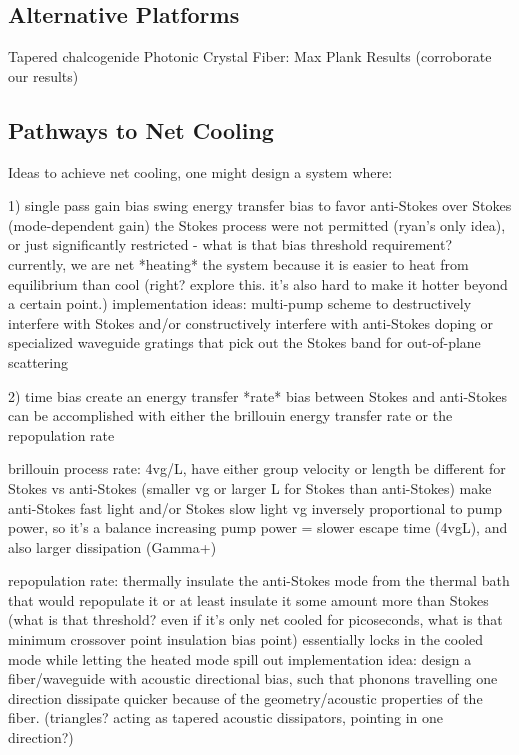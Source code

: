 
\subsection{Alternative Platforms}
\label{Cooling:subsec:AlternativePlatforms}

Tapered chalcogenide Photonic Crystal Fiber: Max Plank Results (corroborate our results)

\subsection{Pathways to Net Cooling}
\label{Cooling:subsec:PathwaystoNetCooling}

Ideas to achieve net cooling, one might design a system where:

1) single pass gain bias
     swing energy transfer bias to favor anti-Stokes over Stokes (mode-dependent gain)
     the Stokes process were not permitted (ryan's only idea), or just significantly restricted - what is that bias threshold requirement?
     currently, we are net *heating* the system because it is easier to heat from equilibrium than cool (right? explore this. it's also hard to make it hotter beyond a certain point.)
     implementation ideas:
       multi-pump scheme to destructively interfere with Stokes and/or constructively interfere with anti-Stokes
       doping or specialized waveguide gratings that pick out the Stokes band for out-of-plane scattering

2) time bias
     create an energy transfer *rate* bias between Stokes and anti-Stokes
     can be accomplished with either the brillouin energy transfer rate or the repopulation rate

       brillouin process rate:
         4vg/L, have either group velocity or length be different for Stokes vs anti-Stokes (smaller vg or larger L for Stokes than anti-Stokes)
         make anti-Stokes fast light and/or Stokes slow light
         vg inversely proportional to pump power, so it's a balance
           increasing pump power = slower escape time (4vgL), and also larger dissipation (Gamma+)

       repopulation rate:
         thermally insulate the anti-Stokes mode from the thermal bath that would repopulate it
         or at least insulate it some amount more than Stokes (what is that threshold? even if it's only net cooled for picoseconds, what is that minimum crossover point insulation bias point)
         essentially locks in the cooled mode while letting the heated mode spill out
         implementation idea:
           design a fiber/waveguide with acoustic directional bias, such that phonons travelling one direction dissipate quicker because of the geometry/acoustic properties of the fiber. (triangles? acting as tapered acoustic dissipators, pointing in one direction?)

